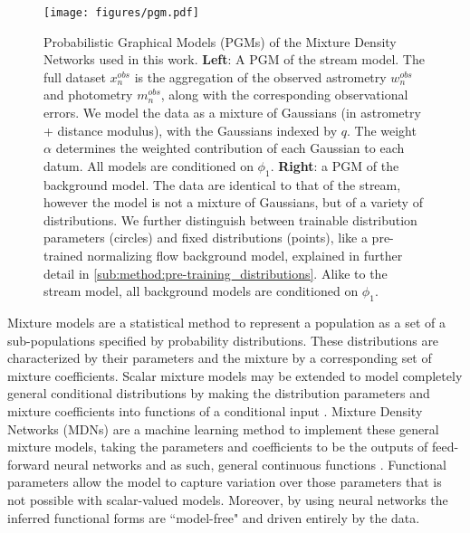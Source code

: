 \documentclass[twocolumn, linenumbers]{aastex631}
\begin{document}
        \begin{figure*}
            \centering
            \texttt{[image: figures/pgm.pdf]}
            \caption{%
                Probabilistic Graphical Models (PGMs) of the Mixture Density
                Networks used in this work.
                \textbf{Left}: A PGM of the stream model. The full dataset
                $x_n^{obs}$ is the aggregation of the observed astrometry
                $w_n^{obs}$ and photometry $m_n^{obs}$, along with the
                corresponding observational errors. We model the data as a
                mixture of Gaussians (in astrometry + distance modulus), with
                the Gaussians indexed by $q$. The weight $\alpha$ determines the
                weighted contribution of each Gaussian to each datum. All models
                are conditioned on $\phi_1$.
                \textbf{Right}: a PGM of the background model. The data are
                identical to that of the stream, however the model is not a
                mixture of Gaussians, but of a variety of distributions. We
                further distinguish between trainable distribution parameters
                (circles) and fixed distributions (points), like a pre-trained
                normalizing flow background model, explained in further detail
                in \autoref{sub:method:pre-training_distributions}. Alike to the
                stream model, all background models are conditioned on $\phi_1$.
            }
            \label{fig:PGM}
        \end{figure*}

        Mixture models are a statistical method to represent a population as a
        set of a sub-populations specified by probability distributions.  These
        distributions are characterized by their parameters and the mixture by a
        corresponding set of mixture coefficients. Scalar mixture models may be
        extended to model completely general conditional distributions by making
        the distribution parameters and mixture coefficients into functions of a
        conditional input \citep{McLachlanBasford1989}.  Mixture Density
        Networks (MDNs) are a machine learning method to implement these general
        mixture models, taking the parameters and coefficients to be the outputs
        of feed-forward neural networks and as such, general continuous
        functions \citep{Bishop1994}.  Functional parameters allow the model to
        capture variation over those parameters that is not possible with
        scalar-valued models. Moreover, by using neural networks the inferred
        functional forms are ``model-free" and driven entirely by the data.
\end{document}
